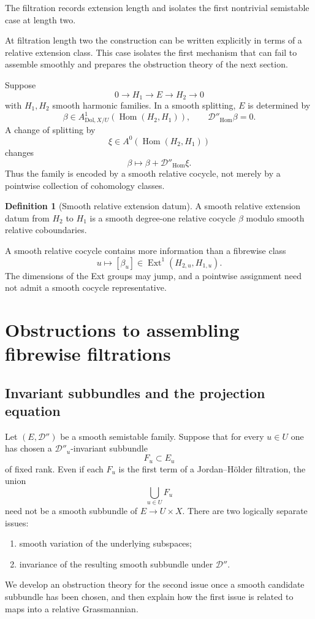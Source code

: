 \documentclass[11pt,reqno]{amsart}
\theoremstyle{definition}
\newtheorem{definition}[theorem]{Definition}
\theoremstyle{remark}
\newcommand{\cD}{\mathcal D}
\newcommand{\Hom}{\operatorname{Hom}}
\newcommand{\Ext}{\operatorname{Ext}}
\newcommand{\Dol}{\mathrm{Dol}}
\begin{document}
The filtration records extension length and isolates the first nontrivial semistable case at length two.


At filtration length two the construction can be written explicitly in terms of a relative extension class.  This case isolates the first mechanism that can fail to assemble smoothly and prepares the obstruction theory of the next section.


Suppose
\[
  0\to H_1\to E\to H_2\to0
\]
with $H_1,H_2$ smooth harmonic families.  In a smooth splitting, $E$ is determined by
\[
  \beta\in A^1_{\Dol,X/U}(\Hom(H_2,H_1)),
  \qquad
  \cD''_{\Hom}\beta=0.
\]
A change of splitting by
\[
  \xi\in A^0(\Hom(H_2,H_1))
\]
changes
\[
  \beta\mapsto\beta+\cD''_{\Hom}\xi.
\]
Thus the family is encoded by a smooth relative cocycle, not merely by a pointwise collection of cohomology classes.

\begin{definition}[Smooth relative extension datum]\label{def:smooth-relative-ext}
A smooth relative extension datum from $H_2$ to $H_1$ is a smooth degree-one relative cocycle $\beta$ modulo smooth relative coboundaries.
\end{definition}

A smooth relative cocycle contains more information than a fibrewise class
\[
  u\mapsto[\beta_u]\in\Ext^1(H_{2,u},H_{1,u}).
\]
The dimensions of the Ext groups may jump, and a pointwise assignment need not admit a smooth cocycle representative.

\section{Obstructions to assembling fibrewise filtrations}\label{sec:obstructions}

\subsection{Invariant subbundles and the projection equation}

Let $(E,\cD'')$ be a smooth semistable family.  Suppose that for every $u\in U$ one has chosen a $\cD''_u$-invariant subbundle
\[
  F_u\subset E_u
\]
of fixed rank.  Even if each $F_u$ is the first term of a Jordan--H\"older filtration, the union
\[
  \bigcup_{u\in U}F_u
\]
need not be a smooth subbundle of $E\to U\times X$.  There are two logically separate issues:
\begin{enumerate}[label=(\roman*)]
\item smooth variation of the underlying subspaces;
\item invariance of the resulting smooth subbundle under $\cD''$.
\end{enumerate}
We develop an obstruction theory for the second issue once a smooth candidate subbundle has been chosen, and then explain how the first issue is related to maps into a relative Grassmannian.
\end{document}

